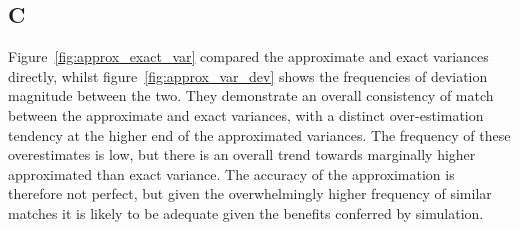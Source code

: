 \documentclass[a4paper,12pt]{article}
\begin{document}
\subsection*{C}
Figure~\ref{fig:approx_exact_var} compared the approximate and exact variances directly, whilst figure~\ref{fig:approx_var_dev} shows the frequencies of deviation magnitude between the two. They demonstrate an overall consistency of match between the approximate and exact variances, with a distinct over-estimation tendency at the higher end of the approximated variances. The frequency of these overestimates is low, but there is an overall trend towards marginally higher approximated than exact variance. The accuracy of the approximation is therefore not perfect, but given the overwhelmingly higher frequency of similar matches it is likely to be adequate given the benefits conferred by simulation.
\end{document}
